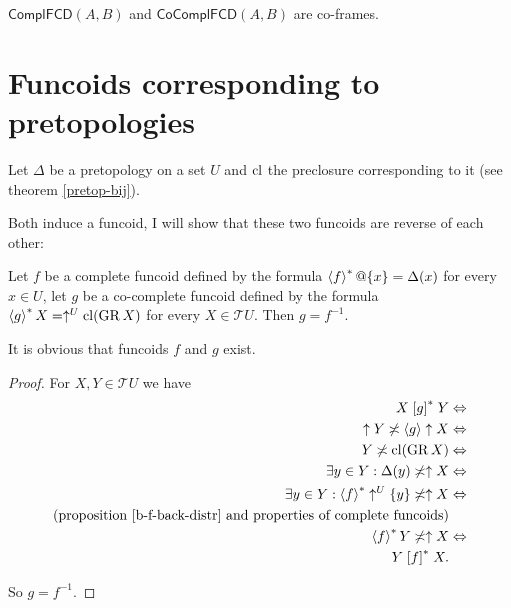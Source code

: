 \begin{cor}
$\mathsf{ComplFCD}(A,B)$ and $\mathsf{CoComplFCD}(A,B)$ are co-frames.
\end{cor}

\section{Funcoids corresponding to pretopologies}

Let $\Delta$ be a pretopology on a set $U$ and $\operatorname{cl}$ the preclosure
corresponding to it (see theorem \ref{pretop-bij}).

Both induce a funcoid, I will show that these two funcoids are reverse
of each other:
\begin{thm}
Let $f$ be a complete funcoid defined by the formula $\left\langle f\right\rangle ^{\ast}@\{x\}=\Delta(x)$
for every $x\in U$, let $g$ be a co-complete funcoid defined by
the formula $\left\langle g\right\rangle ^{\ast}X=\uparrow^{U}\operatorname{cl}(\operatorname{GR} X)$ for every $X\in\mathscr{T}U$.
Then $g=f^{-1}$.\end{thm}
\begin{rem}
It is obvious that funcoids $f$ and $g$ exist.\end{rem}
\begin{proof}
For $X,Y\in\mathscr{T}U$ we have
\begin{align*}
X\mathrel{\left[g\right]^{\ast}}Y & \Leftrightarrow\\
\uparrow Y\not\asymp\left\langle g\right\rangle\uparrow X & \Leftrightarrow\\
Y\not\asymp\operatorname{cl}(\operatorname{GR} X) & \Leftrightarrow\\
\exists y\in Y:\Delta(y)\not\asymp\uparrow X & \Leftrightarrow\\
\exists y\in Y:\left\langle f\right\rangle ^{\ast}\uparrow^{U}\{y\}\not\asymp\uparrow X & \Leftrightarrow\\
\text{(proposition \ref{b-f-back-distr} and properties of complete funcoids)}\\
\left\langle f\right\rangle ^{\ast}Y\not\asymp\uparrow X & \Leftrightarrow\\
Y\mathrel{\left[f\right]^{\ast}}X.
\end{align*}


So $g=f^{-1}$.
\end{proof}

